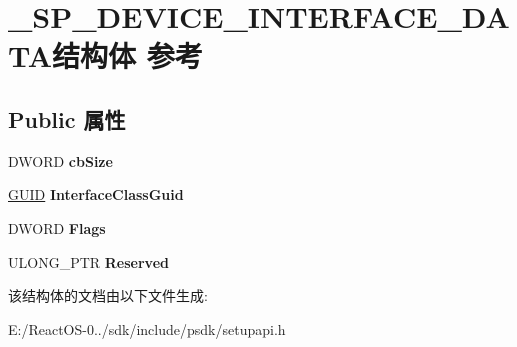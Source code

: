 \hypertarget{struct___s_p___d_e_v_i_c_e___i_n_t_e_r_f_a_c_e___d_a_t_a}{}\section{\+\_\+\+S\+P\+\_\+\+D\+E\+V\+I\+C\+E\+\_\+\+I\+N\+T\+E\+R\+F\+A\+C\+E\+\_\+\+D\+A\+T\+A结构体 参考}
\label{struct___s_p___d_e_v_i_c_e___i_n_t_e_r_f_a_c_e___d_a_t_a}
\subsection*{Public 属性}
\begin{DoxyCompactItemize}
\item 
\mbox{\label{struct___s_p___d_e_v_i_c_e___i_n_t_e_r_f_a_c_e___d_a_t_a_a4461b25175e30ee15acc9e875224698e}} 
D\+W\+O\+RD {\bfseries cb\+Size}
\item 
\mbox{\label{struct___s_p___d_e_v_i_c_e___i_n_t_e_r_f_a_c_e___d_a_t_a_a3d9070fbda618cc292020dad6d4b9d01}} 
\hyperlink{interface_g_u_i_d}{G\+U\+ID} {\bfseries Interface\+Class\+Guid}
\item 
\mbox{\label{struct___s_p___d_e_v_i_c_e___i_n_t_e_r_f_a_c_e___d_a_t_a_a4497361f147af913b8fa3fc27f537b35}} 
D\+W\+O\+RD {\bfseries Flags}
\item 
\mbox{\label{struct___s_p___d_e_v_i_c_e___i_n_t_e_r_f_a_c_e___d_a_t_a_a455d051296b3c97ed5561127963810e2}} 
U\+L\+O\+N\+G\+\_\+\+P\+TR {\bfseries Reserved}
\end{DoxyCompactItemize}


该结构体的文档由以下文件生成\+:\begin{DoxyCompactItemize}
\item 
E\+:/\+React\+O\+S-\/0../sdk/include/psdk/setupapi.\+h\end{DoxyCompactItemize}

